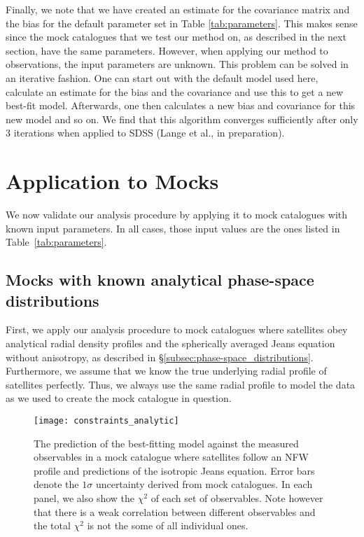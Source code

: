 \documentclass[fleqn,usenatbib,useAMS]{mnras}
\begin{document}
	Finally, we note that we have created an estimate for the covariance matrix and the bias for the default parameter set in Table \ref{tab:parameters}. This makes sense since the mock catalogues that we test our method on, as described in the next section, have the same parameters. However, when applying our method to observations, the input parameters are unknown. This problem can be solved in an iterative fashion. One can start out with the default model used here, calculate an estimate for the bias and the covariance and use this to get a new best-fit model. Afterwards, one then calculates a new bias and covariance for this new model and so on. We find that this algorithm converges sufficiently after only $3$ iterations when applied to SDSS (Lange et al., in preparation).
	
	\section{Application to Mocks}
	\label{sec:application_mocks}
	
	We now validate our analysis procedure by applying it to mock catalogues with known input parameters. In all cases, those input values are the ones listed in Table~\ref{tab:parameters}.
	
	\subsection{Mocks with known analytical phase-space distributions}
	
	First, we apply our analysis procedure to mock catalogues where satellites obey analytical radial density profiles and the spherically averaged Jeans equation without anisotropy, as described in \S\ref{subsec:phase-space_distributions}. Furthermore, we assume that we know the true underlying radial profile of satellites perfectly. Thus, we always use the same radial profile to model the data as we used to create the mock catalogue in question.
	\begin{figure*}
		\centering
		\texttt{[image: constraints\_analytic]}
		\caption{The prediction of the best-fitting model against the measured observables in a mock catalogue where satellites follow an NFW profile and predictions of the isotropic Jeans equation. Error bars denote the $1\sigma$ uncertainty derived from mock catalogues. In each panel, we also show the $\chi^2$ of each set of observables. Note however that there is a weak correlation between different observables and the total $\chi^2$ is not the some of all individual ones.}
		\label{fig:nfw_constraints_analytic}
	\end{figure*}
	
\end{document}
